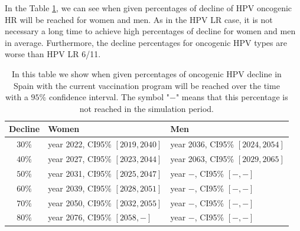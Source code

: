 In the Table \ref{tabla:oncoESP}, we can see when given percentages of decline of HPV oncogenic HR will be reached for women and men. As in the HPV LR case, it is not necessary a long time to achieve high percentages of decline for women and men in average. Furthermore, the decline percentages for oncogenic HPV types are worse than HPV LR 6/11.

\begin{table}[!h]
	\centering
	\begin{tabular}{c|ll}
		Decline & Women & Men \\ 
		\hline 
$ 30 \%$ & year 2022, CI95\% $[ 2019 , 2040 ]$ & year 2036, CI95\% $[ 2024 , 2054 ]$  \\
$ 40 \%$ & year 2027, CI95\% $[ 2023 , 2044 ]$ & year 2063, CI95\% $[ 2029 , 2065 ]$  \\
$ 50 \%$ & year 2031, CI95\% $[ 2025 , 2047 ]$ & year $-$, CI95\% $[ - , - ]$  \\
$ 60 \%$ & year 2039, CI95\% $[ 2028 , 2051 ]$ & year $-$, CI95\% $[ - , - ]$  \\
$ 70 \%$ & year 2050, CI95\% $[ 2032 , 2055 ]$ & year $-$, CI95\% $[ - , - ]$  \\
$ 80 \%$ & year 2076, CI95\% $[ 2058 , - ]$ & year $-$, CI95\% $[ - , - ]$  \\
    \end{tabular} 
	\caption{In this table we show when given percentages of oncogenic HPV decline in Spain with the current vaccination program will be reached over the time with a $95\%$ confidence interval. The symbol "$-$" means that this percentage is not reached in the simulation period. }
	\label{tabla:oncoESP}
\end{table}


